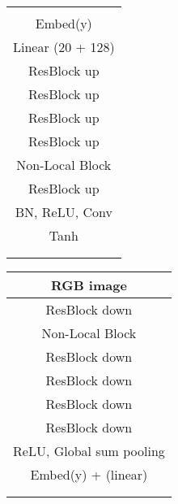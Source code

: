 \documentclass[10pt,twocolumn,letterpaper]{article}
\begin{document}
\begin{table*}[t]
	\vspace{-1em}
	\setlength{\tabcolsep}{0.25em}
	\renewcommand{\arraystretch}{1.5}
	\centering


	\begin{minipage}[t]{.45\textwidth}
	\centering
	\begin{tabular}{c}
	\hline 	\hline
     \\
	Embed(y) \\
	\hline
	Linear (20 + 128)  \\
	\hline
	ResBlock up  \\
	\hline
	ResBlock up  \\
	\hline
	ResBlock up  \\
	\hline
	ResBlock up  \\
	\hline
	Non-Local Block  \\
	\hline
	ResBlock up  \\
	\hline
	BN, ReLU,  Conv  \\
	\hline
	Tanh \\
	\hline 	\hline \\ \\
     \end{tabular}
\end{minipage} \hspace{0.5cm}	\begin{minipage}[t]{.45\textwidth}
\centering
{}
\begin{tabular}{c}
	\hline 	\hline
	RGB image  \\
	\hline
	ResBlock down  \\
	\hline
	Non-Local Block  \\
	\hline
	ResBlock down  \\
	\hline
	ResBlock down  \\
	\hline
	ResBlock down  \\
	\hline
	ResBlock down  \\
	\hline
	ReLU, Global sum pooling \\
	\hline
	Embed(y) + (linear)	 \\
	\hline 	\hline \\ \\
\end{tabular}\end{minipage}



\end{table*}
\end{document}

